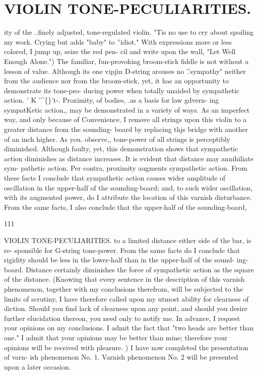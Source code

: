 \documentclass{article}
\begin{document}
\section*{VIOLIN TONE-PECULIARITIES.}
ity of the ..finely adjusted, tone-regulated violin. "Tis no use to cry about spoiling my work. Crying but adds "baby" to ''idiot." With expressions more or less colored, I jump up, seize the red pen- cil and write upon the wall, "Let Well Enough Alone.") The familiar, fun-provoking broom-stick fiddle is not without a lesson of value. Although its one vipjin D-string arouses no '.'sympathy" neither from the audience nor from the broom-stick, yet, it has an opportunity to demonstrate its tone-pro- ducing power when totally unaided by sympathetic action. ' K '\textasciicircum\{\}'t-. Proximity, of bodies, .as a basis for law gdvern- ing sympatKetic action,, may be demonstrated in a variety of ways. As an imperfect way, and only because of Convenience, I remove all strings upon this violin to a greater distance from the sounding- board by replacing thjs bridge with another of an inch higher. As you. observe,, tone-power of all strings is perceptibly diminished. Although faulty, yet, this demonstration shows that sympathetic action diminishes as distance increases. It is evident that distance may annihiliate sym- pathetic action. Per contra, proximity augments sympathetic action. From these facts I conclude that sympathetic action causes wider amplitude of oscillation in the upper-half of the sounding-board; and, to such wider oscillation, with its augmented power, do I attribute the location of this varnish disturbance. From the same facts, I also conclude that the upper-half of the sounding-board,

111

VIOLIN TONE-PECULIARITIES. to a limited distance either side of the bar, is re- sponsible for G-string tone-power. From the same facts do I conclude that rigidity should be less in the lower-half than in the upper-half of the sound- ing-board. Distance certainly diminishes the force of sympathetic action as the square of the distance. (Knowing that every sentence in the description of this varnish phenomenon, together with my conclusions therefrom, will be subjected to the limits of scrutiny, I have therefore called upon my utmost ability for clearness of diction. Should you find lack of clearness upon any point, and should you desire further elucidation thereon, you need only to notify me. In advance, I request your opinions on my conclusions. I admit the fact that "two heads are better than one." I admit that your opinions may be better than mine; therefore your opinions will be received with pleasure. ) I have now completed the presentation of varn- ish phenomenon No. 1. Varnish phenomenon No. 2 will be presented upon a later occasion.
\end{document}
